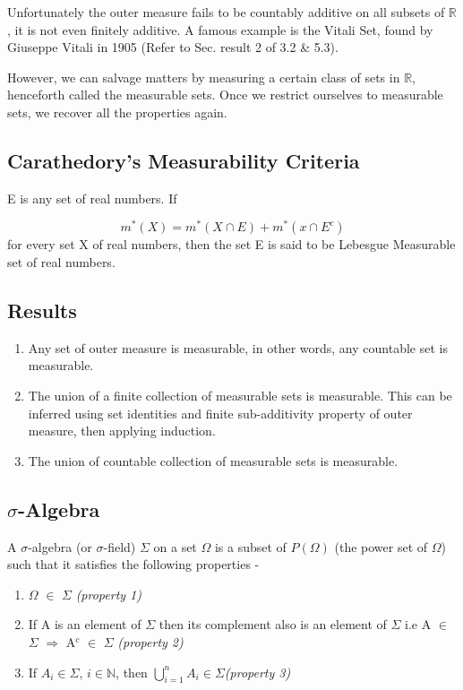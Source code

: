 \documentclass{article}
\begin{document}
Unfortunately the outer measure fails to be countably additive on all subsets of $\mathbb{R}$, it is not even finitely additive. A famous example is the Vitali Set, found by Giuseppe Vitali in 1905 (Refer to Sec. result 2 of 3.2 \& 5.3).\smallskip

However, we can salvage matters by measuring a certain class of sets in $\mathbb{R}$, henceforth called the measurable sets. Once we restrict ourselves to measurable sets, we recover all the properties again.

\subsection{Carathedory's Measurability Criteria}

E is any set of real numbers. If

$$m^*(X)= m^*(X \cap E) + m^*(x \cap E^c) $$
for every set X of real numbers, then the set E is said to be Lebesgue Measurable set of real numbers.

\subsection{Results}
\begin{enumerate}
    \item Any set of outer measure is measurable, in other words, any countable set is measurable.
    \item The union of a finite collection of measurable sets is measurable. This can be inferred using set identities and finite sub-additivity property of outer measure, then applying induction.
    \item The union of countable collection of measurable sets is measurable.
\end{enumerate}

\subsection{$\sigma$-Algebra}
A $\sigma$-algebra (or $\sigma$-field) $\Sigma$ on a set $\Omega$ is a subset of $P(\Omega)$ (the power set of $\Omega$) such that it satisfies the following properties -


\begin{enumerate}
	\item $\Omega$ $\in$ $\Sigma$ \textit{(property 1)}
	\item If A is an element of $\Sigma$ then its complement also is an element of $\Sigma$ i.e A $\in$ $\Sigma$ $\Rightarrow$ A$^c$ $\in$ $\Sigma$ \textit{(\textit{property 2})}
	\item If $A_i \in \Sigma$, 
	$i\in \mathbb{N}$, then $\bigcup\limits_{i=1}^{n}A_i \in \Sigma$\textit{(\textit{property 3})}
\end{enumerate}
\end{document}
